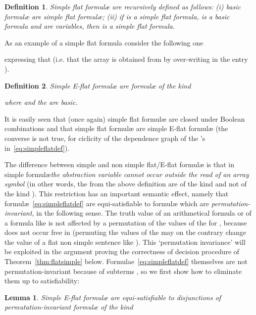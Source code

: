 \documentclass[11pt,a4paper]{article}
\newcommand{\formulae}{formul\ae\xspace}
\newtheorem{definition}{Definition}
\newtheorem{lemma}{Lemma}
\begin{document}
\begin{definition}
 Simple flat \formulae are recursively defined as follows: (i) basic \formulae are simple flat \formulae; 
(ii) if  is a simple flat formula,
 is a basic formula and  are variables, then  is a  simple flat formula.
\end{definition}


As an example of a simple flat formula consider the following one 

expressing that  (i.e. that the array  is obtained from  by over-writing  in the entry ). 

\begin{definition}
Simple E-flat \formulae are \formulae of the kind 
  
where  and the  are basic.
\end{definition}


It is easily seen that (once again) simple flat \formulae are closed under Boolean combinations and that simple flat \formulae are simple E-flat \formulae 
(the converse is not true, for ciclicity of the dependence graph of the 's in~\eqref{eq:simpleflatdef}). 

The difference between simple and non simple
flat/E-flat \formulae is that in simple \formulae \emph{the abstraction variable cannot occur outside the read of an array symbol} (in other words,  the  from the
above definition are of the kind  and not of the kind ).
This restriction has an important semantic effect, namely that \formulae~\eqref{eq:simpleflatdef} are equi-satisfiable to \formulae which are \emph{permutation-invariant}, in the following sense. The truth
value of an arithmetical formula or of a formula like  is not affected by a permutation of the values of the  for , because 
 does not occur free in  (permuting the values of the  may on the contrary change the value of a flat non simple sentence like 
). This `permutation invariance' will be exploited in the argument proving the correctness of decision procedure  of Theorem~\ref{thm:flatsimple} below. 
Formulae~\eqref{eq:simpleflatdef} 
themselves 
are not permutation-invariant because of 
subterms , so we first show how to eliminate them up to satisfiability:



\begin{lemma}
 Simple E-flat \formulae are equi-satisfiable to disjunctions of per\-mu\-ta\-tion-invariant \formulae of the kind
  
\end{lemma}
\end{document}

